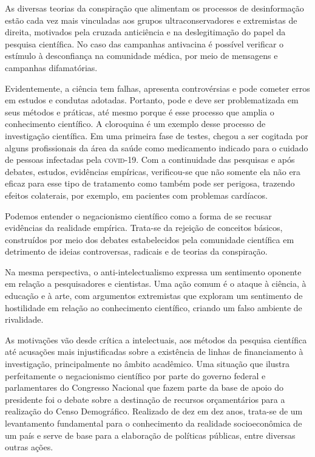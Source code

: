 As diversas teorias da conspiração que alimentam os processos de
desinformação estão cada vez mais vinculadas aos grupos
ultraconservadores e extremistas de direita, motivados pela cruzada
anticiência e na deslegitimação do papel da pesquisa científica. No caso
das campanhas antivacina é possível verificar o estímulo à desconfiança
na comunidade médica, por meio de mensagens e campanhas difamatórias.

Evidentemente, a ciência tem falhas, apresenta controvérsias e pode
cometer erros em estudos e condutas adotadas. Portanto, pode e deve ser
problematizada em seus métodos e práticas, até mesmo porque é esse
processo que amplia o conhecimento científico. A cloroquina é um exemplo
desse processo de investigação científica. Em uma primeira fase de
testes, chegou a ser cogitada por alguns profissionais da área da saúde
como medicamento indicado para o cuidado de pessoas infectadas pela
\textsc{covid-19}. Com a continuidade das pesquisas e após debates, estudos,
evidências empíricas, verificou-se que não somente ela não era eficaz
para esse tipo de tratamento como também pode ser perigosa, trazendo
efeitos colaterais, por exemplo, em pacientes com problemas cardíacos.

Podemos entender o negacionismo científico como a forma de se recusar
evidências da realidade empírica. Trata-se da rejeição de conceitos
básicos, construídos por meio dos debates estabelecidos pela comunidade
científica em detrimento de ideias controversas, radicais e de teorias
da conspiração.

Na mesma perspectiva, o anti-intelectualismo expressa um sentimento
oponente em relação a pesquisadores e cientistas. Uma ação comum é o
ataque à ciência, à educação e à arte, com argumentos extremistas que
exploram um sentimento de hostilidade em relação ao conhecimento
científico, criando um falso ambiente de rivalidade.

As motivações vão desde crítica a intelectuais, aos métodos da pesquisa
científica até acusações mais injustificadas sobre a existência de
linhas de financiamento à investigação, principalmente no âmbito
acadêmico. Uma situação que ilustra perfeitamente o negacionismo
científico por parte do governo federal e parlamentares do Congresso
Nacional que fazem parte da base de apoio do presidente foi o debate
sobre a destinação de recursos orçamentários para a realização do Censo
Demográfico. Realizado de dez em dez anos, trata-se de um levantamento
fundamental para o conhecimento da realidade socioeconômica de um país e
serve de base para a elaboração de políticas públicas, entre diversas
outras ações.

